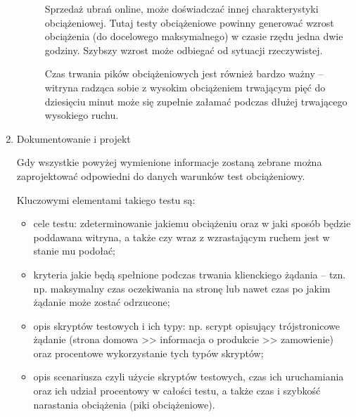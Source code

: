 \begin{enumerate}
\begin{description}
Sprzedaż ubrań online, może doświadczać innej charakterystyki obciążeniowej. Tutaj testy obciążeniowe powinny generować wzrost 
obciążenia (do docelowego maksymalnego) w czasie rzędu jedna dwie godziny. Szybszy wzrost może odbiegać od sytuacji 
rzeczywistej. 

Czas trwania pików obciążeniowych jest również bardzo ważny -- witryna radząca sobie z wysokim obciążeniem trwającym pięć do 
dziesięciu minut może się zupełnie załamać podczas dłużej trwającego wysokiego ruchu. 
    \end{description}

\item Dokumentowanie i projekt

Gdy wszystkie powyżej wymienione informacje zostaną zebrane można zaprojektować odpowiedni do danych warunków test 
obciążeniowy.

Kluczowymi elementami takiego testu są:
    \begin{itemize}
    \item cele testu: zdeterminowanie jakiemu obciążeniu oraz w jaki sposób będzie poddawana witryna, a także czy wraz z 
    wzrastającym ruchem jest w stanie mu podołać;
    \item kryteria jakie będą spełnione podczas trwania klienckiego żądania -- tzn. np. maksymalny czas oczekiwania na stronę lub 
    nawet czas po jakim żądanie może zostać odrzucone;
    \item opis skryptów testowych i ich typy: np. scrypt opisujący trójstronicowe żądanie (strona domowa >> informacja o produkcie 
    >> zamowienie) oraz procentowe wykorzystanie tych typów skryptów;
    \item opis scenariusza czyli użycie skryptów testowych, czas ich uruchamiania oraz ich udział procentowy w całości testu, a 
    także czas i szybkość narastania obciążenia (piki obciążeniowe).
    \end{itemize}
\end{enumerate}
